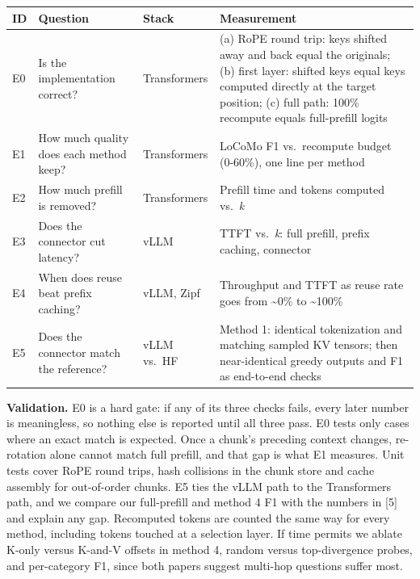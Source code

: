 \documentclass[
  10pt,
]{article}
\begin{document}
\begin{longtable}[]{@{}
  >{\raggedright\arraybackslash}p{}
  >{\raggedright\arraybackslash}p{}
  >{\raggedright\arraybackslash}p{}
  >{\raggedright\arraybackslash}p{}@{}}
\toprule\noalign{}
\begin{minipage}[b]{\linewidth}\raggedright
ID
\end{minipage} & \begin{minipage}[b]{\linewidth}\raggedright
Question
\end{minipage} & \begin{minipage}[b]{\linewidth}\raggedright
Stack
\end{minipage} & \begin{minipage}[b]{\linewidth}\raggedright
Measurement
\end{minipage} \\
\midrule\noalign{}
\endhead
\bottomrule\noalign{}
\endlastfoot
E0 & Is the implementation correct? & Transformers & (a) RoPE round
trip: keys shifted away and back equal the originals; (b) first layer:
shifted keys equal keys computed directly at the target position; (c)
full path: 100\% recompute equals full-prefill logits \\
E1 & How much quality does each method keep? & Transformers & LoCoMo F1
vs.~recompute budget (0-60\%), one line per method \\
E2 & How much prefill is removed? & Transformers & Prefill time and
tokens computed vs.~\emph{k} \\
E3 & Does the connector cut latency? & vLLM & TTFT vs.~\emph{k}: full
prefill, prefix caching, connector \\
E4 & When does reuse beat prefix caching? & vLLM, Zipf & Throughput and
TTFT as reuse rate goes from \textasciitilde0\% to
\textasciitilde100\% \\
E5 & Does the connector match the reference? & vLLM vs.~HF & Method 1:
identical tokenization and matching sampled KV tensors; then
near-identical greedy outputs and F1 as end-to-end checks \\
\end{longtable}

\textbf{Validation.} E0 is a hard gate: if any of its three checks
fails, every later number is meaningless, so nothing else is reported
until all three pass. E0 tests only cases where an exact match is
expected. Once a chunk's preceding context changes, re-rotation alone
cannot match full prefill, and that gap is what E1 measures. Unit tests cover RoPE round
trips, hash collisions in the chunk store and cache assembly for
out-of-order chunks. E5 ties the vLLM path to the Transformers path, and
we compare our full-prefill and method 4 F1 with the numbers in {[}5{]}
and explain any gap. Recomputed tokens are counted the same way for
every method, including tokens touched at a selection layer. If time
permits we ablate K-only versus K-and-V offsets in method 4, random
versus top-divergence probes, and per-category F1, since both papers
suggest multi-hop questions suffer most.
\end{document}

